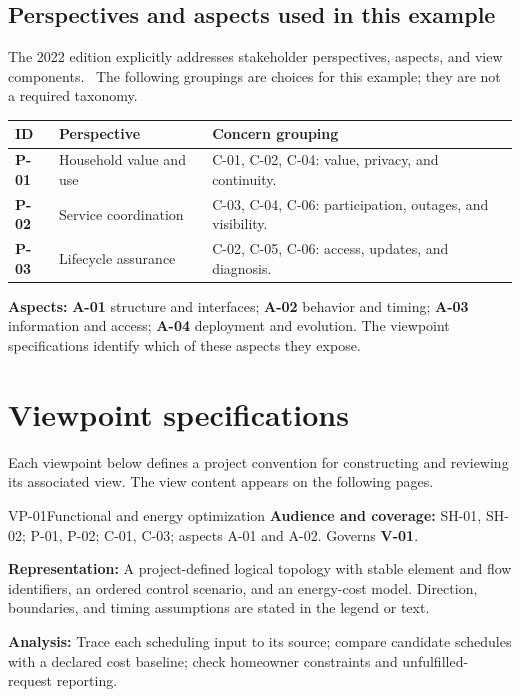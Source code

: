 \documentclass[11pt,letterpaper]{article}
\newcommand{\id}[1]{\textsf{\textbf{#1}}}
\newcommand{\tablehead}[1]{\sffamily\bfseries\color{Navy}#1}
\newcommand{\pageintro}[1]{{\color{Muted}#1}\par\vspace{3pt}}
\begin{document}
\subsection{Perspectives and aspects used in this example}
The 2022 edition explicitly addresses stakeholder perspectives, aspects, and
view components.~\cite{iso-preview} The following groupings are choices for this
example; they are not a required taxonomy.

{\small
\begin{tabularx}{\linewidth}{@{}L{0.46in}L{1.52in}Y@{}}
\toprule
\tablehead{ID} & \tablehead{Perspective} & \tablehead{Concern grouping}\\
\midrule
\id{P-01} & Household value and use & C-01, C-02, C-04: value, privacy, and continuity.\\
\id{P-02} & Service coordination & C-03, C-04, C-06: participation, outages, and visibility.\\
\id{P-03} & Lifecycle assurance & C-02, C-05, C-06: access, updates, and diagnosis.\\
\bottomrule
\end{tabularx}}

\textbf{Aspects:} \id{A-01} structure and interfaces;
\id{A-02} behavior and timing;
\id{A-03} information and access;
\id{A-04} deployment and evolution.
The viewpoint specifications identify which of these aspects they expose.

\newpage
\section{Viewpoint specifications}
\pageintro{Each viewpoint below defines a project convention for constructing and
reviewing its associated view. The view content appears on the following pages.}

\begin{specbox}{VP-01\enspace Functional and energy optimization}
\small
\textbf{Audience and coverage:} SH-01, SH-02; P-01, P-02; C-01, C-03;
aspects A-01 and A-02. Governs \id{V-01}.

\textbf{Representation:} A project-defined logical topology with stable element
and flow identifiers, an ordered control scenario, and an energy-cost model.
Direction, boundaries, and timing assumptions are stated in the legend or text.

\textbf{Analysis:} Trace each scheduling input to its source; compare candidate
schedules with a declared cost baseline; check homeowner constraints and
unfulfilled-request reporting.
\end{specbox}
\end{document}
